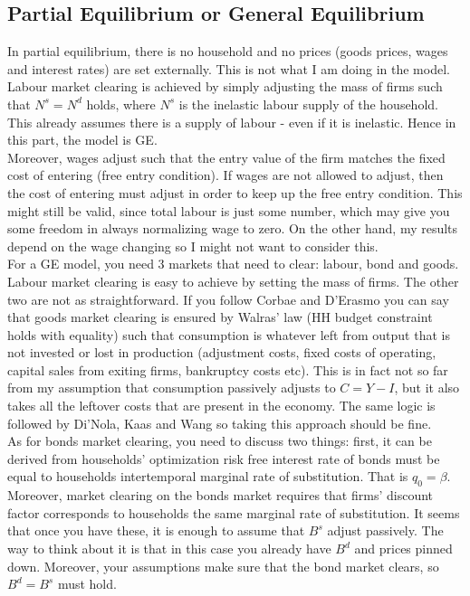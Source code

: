 \documentclass[12pt]{article}
\begin{document}
\subsection*{Partial Equilibrium or General Equilibrium}
In partial equilibrium, there is no household and no prices (goods prices, wages and interest rates) are set externally. This is not what I am doing in the model. Labour market clearing is achieved by simply adjusting the mass of firms such that $N^s = N^d$ holds, where $N^s$ is the inelastic labour supply of the household. This already assumes there is a supply of labour - even if it is inelastic. Hence in this part, the model is GE. \vspace{3mm} \\
Moreover, wages adjust such that the entry value of the firm matches the fixed cost of entering (free entry condition). If wages are not allowed to adjust, then the cost of entering must adjust in order to keep up the free entry condition. This might still be valid, since total labour is just some number, which may give you some freedom in always normalizing wage to zero. On the other hand, my results depend on the wage changing so I might not want to consider this. \vspace{3mm} \\
For a GE model, you need 3 markets that need to clear: labour, bond and goods. Labour market clearing is easy to achieve by setting the mass of firms. The other two are not as straightforward. If you follow Corbae and D'Erasmo you can say that goods market clearing is ensured by Walras' law (HH budget constraint holds with equality) such that consumption is whatever left from output that is not invested or lost in production (adjustment costs, fixed costs of operating, capital sales from exiting firms, bankruptcy costs etc). This is in fact not so far from my assumption that consumption passively adjusts to $C = Y - I$, but it also takes all the leftover costs that are present in the economy. The same logic is followed by Di'Nola, Kaas and Wang so taking this approach should be fine.  \vspace{3mm} \\ 
As for bonds market clearing, you need to discuss two things: first, it can be derived from households' optimization risk free interest rate of bonds must be equal to households intertemporal marginal rate of substitution. That is $q_0 = \beta$. Moreover, market clearing on the bonds market requires that firms' discount factor corresponds to households the same marginal rate of substitution. It seems that once you have these, it is enough to assume that $B^s$ adjust passively. The way to think about it is that in this case you already have $B^d$ and prices pinned down. Moreover, your assumptions make sure that the bond market clears, so $B^d = B^s$ must hold. \vspace{3mm} \\
\end{document}
